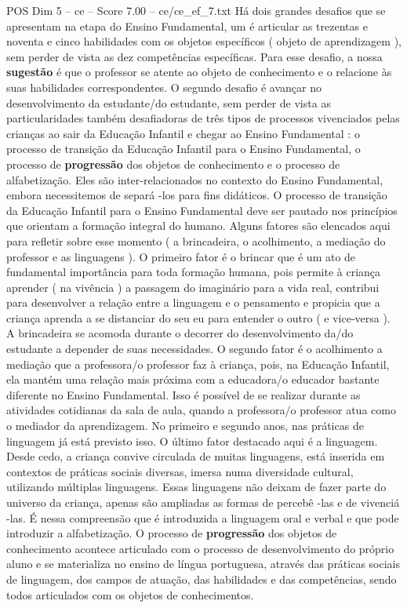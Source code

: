 \begin{textsample}{POS Dim 5 – ce – Score 7.00 – ce/ce\_ef\_7.txt}
Há dois grandes desafios que se apresentam na etapa do Ensino Fundamental, um é articular as trezentas e noventa e cinco habilidades com os objetos específicos ( objeto de aprendizagem ), sem perder de vista as dez competências específicas.
Para esse desafio, a nossa \textbf{sugestão} é que o professor se atente ao objeto de conhecimento e o relacione às suas habilidades correspondentes.
O segundo desafio é avançar no desenvolvimento da estudante/do estudante, sem perder de vista as particularidades também desafiadoras de três tipos de processos vivenciados pelas crianças ao sair da Educação Infantil e chegar ao Ensino Fundamental : o processo de transição da Educação Infantil para o Ensino Fundamental, o processo de \textbf{progressão} dos objetos de conhecimento e o processo de alfabetização.
Eles são inter-relacionados no contexto do Ensino Fundamental, embora necessitemos de separá -los para fins didáticos.
O processo de transição da Educação Infantil para o Ensino Fundamental deve ser pautado nos princípios que orientam a formação integral do humano.
Alguns fatores são elencados aqui para refletir sobre esse momento ( a brincadeira, o acolhimento, a mediação do professor e as linguagens ).
O primeiro fator é o brincar que é um ato de fundamental importância para toda formação humana, pois permite à criança aprender ( na vivência ) a passagem do imaginário para a vida real, contribui para desenvolver a relação entre a linguagem e o pensamento e propicia que a criança aprenda a se distanciar do seu eu para entender o outro ( e vice-versa ).
A brincadeira se acomoda durante o decorrer do desenvolvimento da/do estudante a depender de suas necessidades.
O segundo fator é o acolhimento a mediação que a professora/o professor faz à criança, pois, na Educação Infantil, ela mantém uma relação mais próxima com a educadora/o educador bastante diferente no Ensino Fundamental.
Isso é possível de se realizar durante as atividades cotidianas da sala de aula, quando a professora/o professor atua como o mediador da aprendizagem.
No primeiro e segundo anos, nas práticas de linguagem já está previsto isso.
O último fator destacado aqui é a linguagem.
Desde cedo, a criança convive circulada de muitas linguagens, está inserida em contextos de práticas sociais diversas, imersa numa diversidade cultural, utilizando múltiplas linguagens.
Essas linguagens não deixam de fazer parte do universo da criança, apenas são ampliadas as formas de percebê -las e de vivenciá -las.
É nessa compreensão que é introduzida a linguagem oral e verbal e que pode introduzir a alfabetização.
O processo de \textbf{progressão} dos objetos de conhecimento acontece articulado com o processo de desenvolvimento do próprio aluno e se materializa no ensino de língua portuguesa, através das práticas sociais de linguagem, dos campos de atuação, das habilidades e das competências, sendo todos articulados com os objetos de conhecimentos.

\end{textsample}

